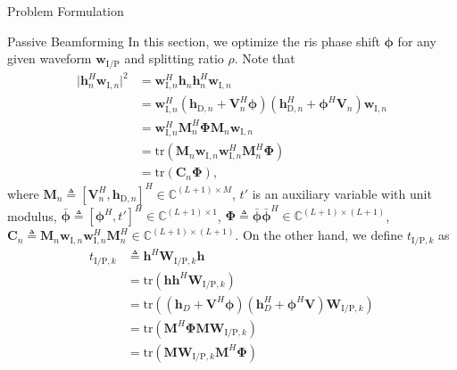\begin{section}{Problem Formulation}
	\begin{subsection}{Passive Beamforming}
		In this section, we optimize the \gls{ris} phase shift $\boldsymbol{\phi}$ for any given waveform $\boldsymbol{w}_{\mathrm{I/P}}$ and splitting ratio $\rho$. Note that
		\begin{align}
			\lvert \boldsymbol{h}_{n}^H\boldsymbol{w}_{\mathrm{I},n} \rvert^2
			& = \boldsymbol{w}_{\mathrm{I},n}^H\boldsymbol{h}_n\boldsymbol{h}_n^H\boldsymbol{w}_{\mathrm{I},n}\nonumber\\
			& = \boldsymbol{w}_{\mathrm{I},n}^H(\boldsymbol{h}_{\mathrm{D},n}+\boldsymbol{V}_n^H\boldsymbol{\phi})(\boldsymbol{h}_{\mathrm{D},n}^H+\boldsymbol{\phi}^H\boldsymbol{V}_n)\boldsymbol{w}_{\mathrm{I},n}\nonumber\\
			& = \boldsymbol{w}_{\mathrm{I},n}^H\boldsymbol{M}_n^H\boldsymbol{\Phi}\boldsymbol{M}_n\boldsymbol{w}_{\mathrm{I},n}\nonumber\\
			& = \mathrm{tr}(\boldsymbol{M}_n\boldsymbol{w}_{\mathrm{I},n}\boldsymbol{w}_{\mathrm{I},n}^H\boldsymbol{M}_n^H\boldsymbol{\Phi})\nonumber\\
			& = \mathrm{tr}(\boldsymbol{C}_n\boldsymbol{\Phi}),
		\end{align}
		where $\boldsymbol{M}_n \triangleq [\boldsymbol{V}_n^H, \boldsymbol{h}_{\mathrm{D},n}]^H \in \mathbb{C}^{(L+1) \times M}$, $t'$ is an auxiliary variable with unit modulus, $\bar{\boldsymbol{\phi}} \triangleq [\boldsymbol{\phi}^H, t']^H \in \mathbb{C}^{(L+1) \times 1}$, $\boldsymbol{\Phi} \triangleq \bar{\boldsymbol{\phi}}\bar{\boldsymbol{\phi}}^H \in \mathbb{C}^{(L+1) \times (L+1)}$, $\boldsymbol{C}_n \triangleq \boldsymbol{M}_n\boldsymbol{w}_{\mathrm{I},n}\boldsymbol{w}_{\mathrm{I},n}^H\boldsymbol{M}_n^H \in \mathbb{C}^{(L+1)\times(L+1)}$. On the other hand, we define $t_{\mathrm{I/P},k}$ as
		\begin{align}
			t_{\mathrm{I/P},k}
			& \triangleq \boldsymbol{h}^H\boldsymbol{W}_{\mathrm{I/P},k}\boldsymbol{h}\nonumber\\
			& = \mathrm{tr}(\boldsymbol{h}\boldsymbol{h}^H\boldsymbol{W}_{\mathrm{I/P},k})\nonumber\\
			& = \mathrm{tr}\left((\boldsymbol{h}_{D}+\boldsymbol{V}^H\boldsymbol{\phi})(\boldsymbol{h}_{D}^H+\boldsymbol{\phi}^H\boldsymbol{V})\boldsymbol{W}_{\mathrm{I/P},k}\right)\nonumber\\
			& = \mathrm{tr}(\boldsymbol{M}^H\boldsymbol{\Phi}\boldsymbol{M}\boldsymbol{W}_{\mathrm{I/P},k})\nonumber\\
			& = \mathrm{tr}(\boldsymbol{M}\boldsymbol{W}_{\mathrm{I/P},k}\boldsymbol{M}^H\boldsymbol{\Phi})\nonumber\\

\end{align}
\end{subsection}
\end{section}
